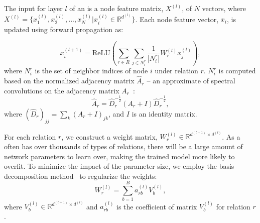  The input for layer $l$ of an \RGCN is a node feature matrix, $X^{(l)}$, of $N$ vectors, where  $X^{(l)} =\{x^{(l)}_1,x^{(l)}_2,...,x^{(l)}_{N}
 |x^{(l)}_{i} \in \mathbb{R}^{d^{(l)}}\}$. Each node feature vector, $x_i$, is updated using forward propagation as:

	\begin{equation}
	x_i^{(l+1)}=\mathrm{ReLU} (\sum\limits_{r \in R}\sum\limits_{j \in N_i^r}\frac{1}{|N_i^r|}W_r^{(l)}x_j^{(l)}),
	\end{equation} where $N_i^r$ is the set of neighbor indices of node $i$ under relation $r$.
    $N_i^r$ is computed based on the normalized adjacency
matrix $\hat A_r$ -- an approximate of spectral convolutions on the adjacency matrix $A_r$~\cite{Kipf2016Semi}:
	\begin{equation}
	\hat A_r=\hat D_r^{- \frac{1}{2}}(A_r+I)\hat D_r^{- \frac{1}{2}},
	\end{equation}
	where $(\hat D_r)_{jj}=\sum_k(A_r+I)_{jk}$, and $I$ is an identity matrix.

	
	 For each relation $r$, we construct a weight matrix, $W_r^{(l)} \in \mathbb{R}^{d^{(l+1)}
\times d^{(l)}}$. As a \KG often has over thousands of types of relations, there will be a large amount of network parameters to learn
over, making the trained model more likely to overfit. To minimize the impact of the parameter size, we employ the basis decomposition
method~\cite{Schlichtkrull2017Modeling} to regularize the weights:
	\begin{equation}
	W_r^{(l)}=\sum\limits_{b=1}^B a_{rb}^{(l)}V_b^{(l)},
	\end{equation}
	where $V_b^{(l)} \in \mathbb{R}^{d^{(l+1)} \times d^{(l)}}$ and $a_{rb}^{(l)}$ is the coefficient of matrix $V_b^{(l)}$ for relation $r$.
	
	


